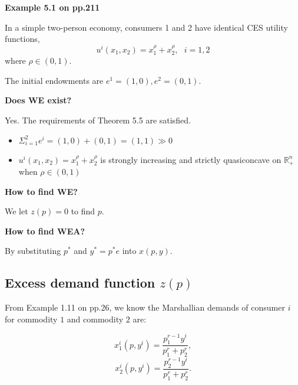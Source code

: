 \documentclass{article}
\newcommand{\R}{\mathbb{R}}
\begin{document}
\vspace{2mm}

\begin{mdframed}[backgroundcolor=blue!20,linecolor=white]
\textbf{Example 5.1 on pp.211}

In a simple two-person economy, consumers 1 and 2 have identical CES utility functions,
$$u^i(x_1,x_2) = x^\rho_1 + x^\rho_2, \ \ \ i= 1,2$$
where $\rho \in (0,1)$.

The initial endowments are $e^1 = (1,0), e^2 = (0,1)$.

\vspace{2mm}

\textbf{Does WE exist?}

Yes. The requirements of Theorem 5.5 are satisfied.

\begin{itemize}
\item $\Sigma_{i=1}^{2} e^i = (1,0) + (0,1) = (1,1) \gg 0$
\item $u^i(x_1,x_2) = x^\rho_1 + x^\rho_2$ is strongly increasing and strictly quasiconcave on $\R^n_{+}$ when $\rho \in (0,1)$
\end{itemize}


\textbf{How to find WE? }

We let $z(p)=0$ to find $p$.

\vspace{2mm}

\textbf{How to find WEA? }

By substituting $p^*$ and $y^* = p^*e$ into $x(p,y)$.








\end{mdframed}

\subsection{Excess demand function $z(p)$}


From Example 1.11 on pp.26, we know the Marshallian demands of consumer $i$ for commodity $1$ and commodity $2$ are:

$$x^i_1(p,y^i) = \frac{p^{r-1}_1y^i}{p_1^r+p_2^r},$$
$$x^i_2(p,y^i) = \frac{p^{r-1}_2y^i}{p_1^r+p_2^r}.$$
\end{document}
